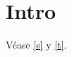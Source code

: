 \documentclass[spanish]{article}
\begin{document}
\section{Intro}\label{s}
Véase \autoref{s} y \autoref{t}.
\begin{table}[h]
\caption{Una tabla}\label{t}
\end{table}
\end{document}
